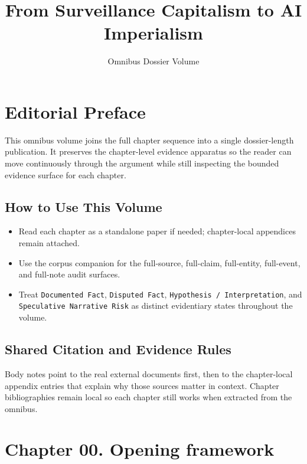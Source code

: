 \documentclass[
  american,
  11pt,
  letterpaper,
]{article}
\title{From Surveillance Capitalism to AI Imperialism}
\subtitle{Omnibus Dossier Volume}
\author{}
\date{}
\providecommand{\tightlist}{%
  \setlength{\itemsep}{0pt}\setlength{\parskip}{0pt}}
\begin{document}
\maketitle

\section{Editorial Preface}\label{editorial-preface}

This omnibus volume joins the full chapter sequence into a single
dossier-length publication. It preserves the chapter-level evidence
apparatus so the reader can move continuously through the argument while
still inspecting the bounded evidence surface for each chapter.

\subsection{How to Use This Volume}\label{how-to-use-this-volume}

\begin{itemize}
\tightlist
\item
  Read each chapter as a standalone paper if needed; chapter-local
  appendices remain attached.
\item
  Use the corpus companion for the full-source, full-claim, full-entity,
  full-event, and full-note audit surfaces.
\item
  Treat \texttt{Documented\ Fact}, \texttt{Disputed\ Fact},
  \texttt{Hypothesis\ /\ Interpretation}, and
  \texttt{Speculative\ Narrative\ Risk} as distinct evidentiary states
  throughout the volume.
\end{itemize}

\subsection{Shared Citation and Evidence
Rules}\label{shared-citation-and-evidence-rules}

Body notes point to the real external documents first, then to the
chapter-local appendix entries that explain why those sources matter in
context. Chapter bibliographies remain local so each chapter still works
when extracted from the omnibus.

\section{Chapter 00. Opening
framework}\label{chapter-00.-opening-framework}
\end{document}
